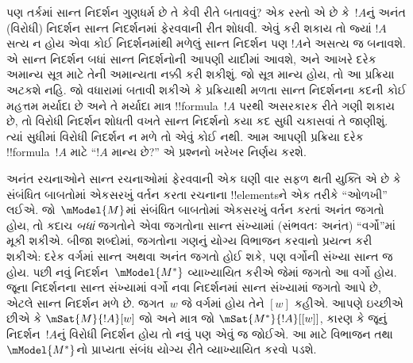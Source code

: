 \documentclass[../../../include/open-logic-section]{subfiles}
\begin{document}
પણ તર્કમાં સાન્ત નિદર્શન ગુણધર્મ છે તે કેવી રીતે બતાવવું? એક રસ્તો
એ છે કે~$!A$નું અનંત (વિરોધી) નિદર્શન સાન્ત નિદર્શનમાં ફેરવવાની
રીત શોધવી. એવું કરી શકાય તો જ્યાં $!A$ સત્ય ન હોય એવા કોઈ
નિદર્શનમાંથી મળેલું સાન્ત નિદર્શન પણ $!A$ને અસત્ય જ બનાવશે.
એ સાન્ત નિદર્શન બધાં સાન્ત નિદર્શનોની આપણી યાદીમાં આવશે, અને
આખરે દરેક અમાન્ય સૂત્ર માટે તેની અમાન્યતા નક્કી કરી શકીશું.
જો સૂત્ર માન્ય હોય, તો આ પ્રક્રિયા અટકશે નહિ. જો વધારામાં બતાવી
શકીએ કે પ્રક્રિયાથી મળતા સાન્ત નિદર્શનના કદની કોઈ મહત્તમ મર્યાદા
છે અને તે મર્યાદા માત્ર !!{formula}~$!A$ પરથી અસરકારક રીતે
ગણી શકાય છે, તો
વિરોધી નિદર્શન શોધતી વખતે સાન્ત નિદર્શનો કયા કદ સુધી ચકાસવાં
તે જાણીશું. ત્યાં સુધીમાં વિરોધી નિદર્શન ન મળે તો એવું કોઈ
નથી. આમ આપણી પ્રક્રિયા દરેક !!{formula}~$!A$ માટે ``$!A$ માન્ય
છે?'' એ પ્રશ્નનો ખરેખર નિર્ણય કરશે.

અનંત રચનાઓને સાન્ત રચનાઓમાં ફેરવવાની એક ઘણી વાર સફળ થતી
યુક્તિ એ છે કે સંબંધિત બાબતોમાં એકસરખું વર્તન કરતા રચનાના
!!{element}sને એક તરીકે ``ઓળખી'' લઈએ. જો~$\mModel{M}$માં
સંબંધિત બાબતોમાં એકસરખું વર્તન કરતાં અનંત જગતો હોય, તો કદાચ
\emph{બધાં} જગતોને એવા જગતોના સાન્ત સંખ્યામાં (સંભવતઃ અનંત)
``વર્ગો''માં મૂકી શકીએ. બીજા શબ્દોમાં, જગતોના ગણનું યોગ્ય
વિભાજન કરવાનો પ્રયત્ન કરી શકીએ: દરેક વર્ગમાં સાન્ત અથવા અનંત જગતો હોઈ શકે,
પણ વર્ગોની સંખ્યા સાન્ત જ હોય.
પછી નવું નિદર્શન~$\mModel{M^*}$ વ્યાખ્યાયિત કરીએ જેમાં જગતો
આ વર્ગો હોય. જૂના નિદર્શનના સાન્ત સંખ્યામાં વર્ગો નવા નિદર્શનમાં
સાન્ત સંખ્યામાં જગતો આપે છે, એટલે સાન્ત નિદર્શન મળે છે.
જગત~$w$ જે વર્ગમાં હોય તેને $[w]$ કહીએ. આપણે ઇચ્છીએ છીએ કે
$\mSat{M}{!A}[w]$ જો અને માત્ર જો $\mSat{M^*}{!A}[{[w]}]$,
કારણ કે જૂનું નિદર્શન~$!A$નું વિરોધી નિદર્શન હોય તો નવું પણ
એવું જ જોઈએ. આ માટે વિભાજન તથા~$\mModel{M^*}$નો પ્રાપ્યતા
સંબંધ યોગ્ય રીતે વ્યાખ્યાયિત કરવો પડશે.
\end{document}
